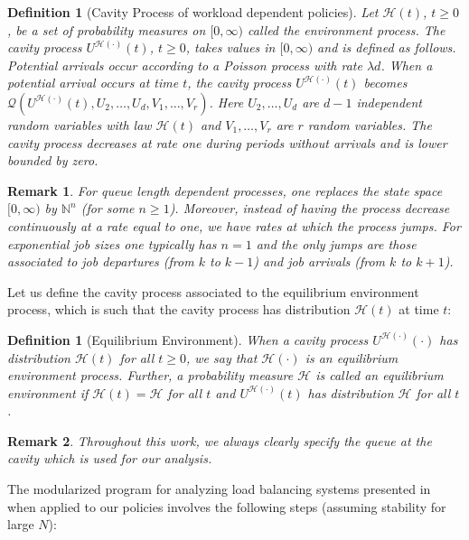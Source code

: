 \documentclass[12pt]{report}
\newtheorem{remark}{Remark}
\newtheorem{definition}[theorem]{Definition}
\begin{document}
\begin{definition}[Cavity Process of workload dependent policies]
	Let $\mathcal{H}(t)$, $t \geq 0$, be a set of probability measures on $[0,\infty)$ called the {\it environment process}. 
	The {\it cavity process} $U^{\mathcal{H}(\cdot)}(t)$, $t \geq 0$, takes values in $[0,\infty)$ and is defined as follows. 
	Potential arrivals occur according to a Poisson process with rate $\lambda d$. When a potential arrival occurs at time $t$, the cavity process $U^{\mathcal{H}(\cdot)}(t)$ becomes $\mathcal{Q}(U^{\mathcal{H}(\cdot)}(t), U_2,\dots,U_d,V_1,\dots,V_r)$. Here $U_2,\dots,U_d$ are $d-1$ independent random variables with law $\mathcal{H}(t)$ and $V_1,\dots,V_r$ are $r$ random variables. The cavity process decreases at rate one during periods without arrivals and is lower bounded by zero.
\end{definition}
\begin{remark}
	For queue length dependent processes, one replaces the state space $[0,\infty)$ by $\mathbb{N}^n$ (for some $n\geq 1$). Moreover, instead of having the process decrease continuously at a rate equal to one, we have rates at which the process jumps. For exponential job sizes one typically has $n=1$ and the only jumps are those associated to job departures (from $k$ to $k-1$) and job arrivals (from $k$ to $k+1$).
\end{remark}
Let us define the cavity process associated to the equilibrium environment process, which is such that the cavity process has distribution $\mathcal{H}(t)$ at time $t$:
\begin{definition}[Equilibrium Environment]
	When a cavity process $U^{\mathcal{H}(\cdot)}(\cdot)$ has distribution 
	$\mathcal{H}(t)$ for all $t \geq 0$, we say that $\mathcal{H}(\cdot)$ is an {\it equilibrium environment process}. 
	Further, a probability measure $\mathcal{H}$ is called an {\it equilibrium environment} if 
	$\mathcal{H}(t) = \mathcal{H}$ for all $t$ and $U^{\mathcal{H}(\cdot)}(t)$ has distribution $\mathcal{H}$ for all $t$.
\end{definition}
\begin{remark}
	Throughout this work, we always clearly specify the queue at the cavity which is used for our analysis.
\end{remark}
The modularized program for analyzing load balancing systems presented in \cite{bramsonLB} when
applied to our policies involves the following steps (assuming stability for large $N$):
\end{document}
